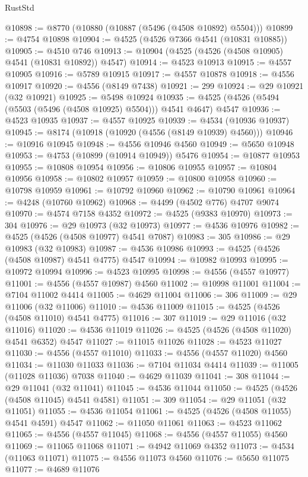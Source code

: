 \begin{lexlean}{RustStd}
\begin{coremodule}
{\begin{coremodule}
{{{{{{{{{{{{{{{{{{{{{{{{{{{{{{{{{{{{{{{{{{{{{{{{{{{{{{{@10898 := @8770 (@10880 (@10887 (@5496 (@4508 @10892) @5504)))
@10899 := @4754 @10898
@10904 := @4525 (@4526 @7366 @4541 (@10831 @10885))
@10905 := @4510 @746
@10913 := @10904 (@4525 (@4526 (@4508 @10905) @4541 (@10831 @10892)) @4547)
@10914 := @4523 @10913
@10915 := @4557 @10905
@10916 := @5789 @10915
@10917 := @4557 @10878
@10918 := @4556 @10917
@10920 := @4556 (@8149 @7438)
@10921 := 299
@10924 := @29 @10921 (@32 @10921)
@10925 := @5498 @10924
@10935 := @4525 (@4526 (@5494 (@5503 (@5496 (@4508 @10925) @5504))) @4541 @4647) @4547
@10936 := @4523 @10935
@10937 := @4557 @10925
@10939 := @4534 (@10936 @10937)
@10945 := @8174 (@10918 (@10920 (@4556 (@8149 @10939) @4560)))
@10946 := @10916 @10945
@10948 := @4556 @10946 @4560
@10949 := @5650 @10948
@10953 := @4753 (@10899 (@10914 @10949)) @5476
@10954 := @10877 @10953
@10955 := @10808 @10954
@10956 := @10806 @10955
@10957 := @10804 @10956
@10958 := @10802 @10957
@10959 := @10800 @10958
@10960 := @10798 @10959
@10961 := @10792 @10960
@10962 := @10790 @10961
@10964 := @4248 (@10760 @10962)
@10968 := @4499 (@4502 @776) @4707 @9074
@10970 := @4574 @7158 @4352
@10972 := @4525 (@9383 @10970)
@10973 := 304
@10976 := @29 @10973 (@32 @10973)
@10977 := @4536 @10976
@10982 := @4525 (@4526 (@4508 @10977) @4541 @7087)
@10983 := 305
@10986 := @29 @10983 (@32 @10983)
@10987 := @4536 @10986
@10993 := @4525 (@4526 (@4508 @10987) @4541 @4775) @4547
@10994 := @10982 @10993
@10995 := @10972 @10994
@10996 := @4523 @10995
@10998 := @4556 (@4557 @10977)
@11001 := @4556 (@4557 @10987) @4560
@11002 := @10998 @11001
@11004 := @7104 @11002 @4414
@11005 := @4629 @11004
@11006 := 306
@11009 := @29 @11006 (@32 @11006)
@11010 := @4536 @11009
@11015 := @4525 (@4526 (@4508 @11010) @4541 @4775)
@11016 := 307
@11019 := @29 @11016 (@32 @11016)
@11020 := @4536 @11019
@11026 := @4525 (@4526 (@4508 @11020) @4541 @6352) @4547
@11027 := @11015 @11026
@11028 := @4523 @11027
@11030 := @4556 (@4557 @11010)
@11033 := @4556 (@4557 @11020) @4560
@11034 := @11030 @11033
@11036 := @7104 @11034 @4414
@11039 := @11005 (@11028 @11036) @7038
@11040 := @4629 @11039
@11041 := 308
@11044 := @29 @11041 (@32 @11041)
@11045 := @4536 @11044
@11050 := @4525 (@4526 (@4508 @11045) @4541 @4581)
@11051 := 309
@11054 := @29 @11051 (@32 @11051)
@11055 := @4536 @11054
@11061 := @4525 (@4526 (@4508 @11055) @4541 @4591) @4547
@11062 := @11050 @11061
@11063 := @4523 @11062
@11065 := @4556 (@4557 @11045)
@11068 := @4556 (@4557 @11055) @4560
@11069 := @11065 @11068
@11071 := @4942 @11069 @4352
@11073 := @4534 (@11063 @11071)
@11075 := @4556 @11073 @4560
@11076 := @5650 @11075
@11077 := @4689 @11076
}}}}}}}}}}}}}}}}}}}}}}}}}}}}}}}}}}}}}}}}}}}}}}}}}}}}}}}
\end{coremodule}}
\end{coremodule}
\end{lexlean}
